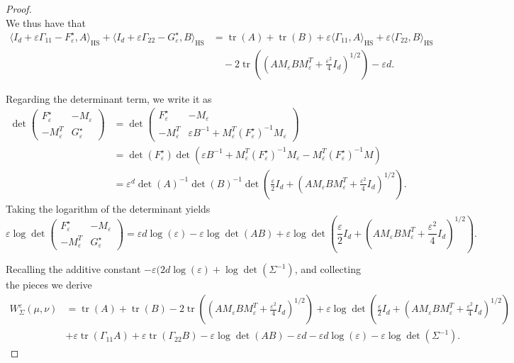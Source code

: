 \documentclass[10pt,a4paper]{amsart}
\DeclareMathOperator{\HS}{HS}
\DeclareMathOperator{\tr}{tr}
\begin{document}
\begin{proof}
\begin{equation*}
	\end{equation*}
	We thus have that 
	\begin{align*}
		\langle I_d+\varepsilon \Gamma_{11} - F_{\varepsilon}^\star, A \rangle_{\HS} + \langle I_d + \varepsilon \Gamma_{22} - G_\varepsilon^{\star}, B \rangle_{\HS} & = \tr(A) + \tr(B) +\varepsilon \langle \Gamma_{11}, A \rangle_{\HS}  +\varepsilon \langle \Gamma_{22}, B \rangle_{\HS} \\
		&\quad  - 2 \tr\left( \left(AM_{\varepsilon}BM_{\varepsilon}^T+ \frac{\varepsilon^2}{4}I_d \right)^{1/2} \right) - \varepsilon d.
	\end{align*}
	
	
	Regarding the determinant term, we write it as 
	\begin{align*}
		\det \begin{pmatrix}
			F_\varepsilon^\star   & -M_{\varepsilon}    \\
			-M_{\varepsilon}^T&    G_\varepsilon^\star
		\end{pmatrix}& =  \det \begin{pmatrix}
			F_\varepsilon^\star  & -M_{\varepsilon}    \\
			-M_{\varepsilon}^T&    \varepsilon B^{-1}+ M_\varepsilon^{T}(F_\varepsilon^{\star})^{-1}M_\varepsilon
		\end{pmatrix} \\
		& = \det ( F_\varepsilon^{\star}) \det(\varepsilon B^{-1}+ M_\varepsilon^{T}(F_\varepsilon^{\star})^{-1}M_{\varepsilon}- M_\varepsilon^{T}(F_\varepsilon^{\star})^{-1}M) \\
		& = \varepsilon^d\det(A)^{-1}\det(B)^{-1} \det\left( \frac{\varepsilon}{2}I_d + \left(AM_{\varepsilon}BM_{\varepsilon}^T+ \frac{\varepsilon^2}{4}I_d \right)^{1/2} \right).
	\end{align*}
	Taking the logarithm of the determinant yields
	\begin{equation*}
		\varepsilon\log \det\begin{pmatrix}
			F_\varepsilon^\star   & -M_{\varepsilon}    \\
			-M_{\varepsilon}^T&    G_\varepsilon^\star
		\end{pmatrix} =  \varepsilon d \log(\varepsilon) - \varepsilon\log \det(AB) + \varepsilon \log \det\left( \frac{\varepsilon}{2}I_d + \left(AM_{\varepsilon}BM_{\varepsilon}^T+ \frac{\varepsilon^2}{4}I_d \right)^{1/2} \right).
	\end{equation*}
	
	Recalling the additive constant $-\varepsilon (2d \log(\varepsilon)+\log \det(\Sigma^{-1})$, and collecting the pieces we derive
	\begin{align*}
		W_{\Sigma}^{\varepsilon}(\mu, \nu)& = \tr(A) + \tr(B) - 2 \tr\left( \left(AM_{\varepsilon}BM_{\varepsilon}^T+ \frac{\varepsilon^2}{4}I_d \right)^{1/2} \right) + \varepsilon \log \det\left( \frac{\varepsilon}{2}I_d + \left(AM_{\varepsilon}BM_{\varepsilon}^T+ \frac{\varepsilon^2}{4}I_d \right)^{1/2} \right) \\
		&+\varepsilon \tr (\Gamma_{11} A )  +\varepsilon \tr (\Gamma_{22} B ) - \varepsilon \log \det(AB) - \varepsilon d - \varepsilon d \log(\varepsilon) - \varepsilon\log \det(\Sigma^{-1}).
	\end{align*}
\end{proof}
\end{document}
